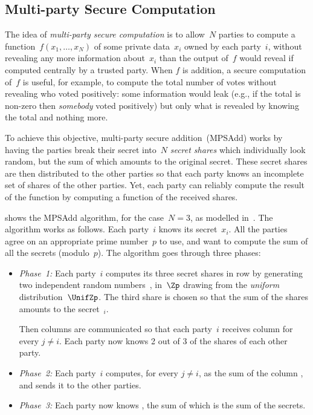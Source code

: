\subsection{Multi-party Secure Computation}
\label{sec:appendix:ex:multiparty}

  The idea of \emph{multi-party secure computation} is to allow~$N$
parties to compute a function~$f(x_1,\dots,x_N)$ of
some private data~$x_i$ owned by each party~$i$,
without revealing any more information about~$x_i$ than the output of~$f$
would reveal if computed centrally by a trusted party.
When $f$ is addition, a secure computation of~$f$ is useful, for example,
to compute the total number of votes without revealing who voted positively:
some information would leak (e.g., if the total is non-zero then \emph{somebody} voted positively) but only what is revealed by knowing the total and nothing more.

To achieve this objective, multi-party secure addition~(MPSAdd)
works by having the parties break their secret into~$N$ \emph{secret shares}
which individually look random, but the sum of which amounts to the original secret.
These secret shares are then distributed to the other parties so that each party knows an incomplete set of shares of the other parties.
Yet, each party can reliably compute the result of the function by computing a function of the received shares.

 shows the MPSAdd algorithm, for the case~$N=3$,
as modelled in~\cite{barthe2019probabilistic}.
The algorithm works as follows.
Each party~$i$ knows its secret~$x_i$.
All the parties agree on an appropriate prime number~$p$ to use,
and want to compute the sum of all the secrets (modulo~$p$).
The algorithm goes through three phases:
\begin{itemize}
  \item\emph{Phase~1:}
    Each party~$i$ computes its three secret shares in row 
    by generating two independent random
    numbers~,  in~$\Zp$
    drawing from the \emph{uniform} distribution~$\UnifZp$.
The third share  is chosen so that the sum of the shares
    amounts to the secret~$_i$.

    Then columns are communicated so that each party~$i$
    receives column  for every $j\ne i$.
    Each party now knows 2 out of 3 of the shares of each other party.
  \item\emph{Phase~2:}
    Each party~$i$
    computes, for every $j\ne i$,
     as the sum of the column ,
    and sends it to the other parties.
  \item\emph{Phase~3:}
    Each party now knows ,
    the sum of which is the sum of the secrets.
\end{itemize}

